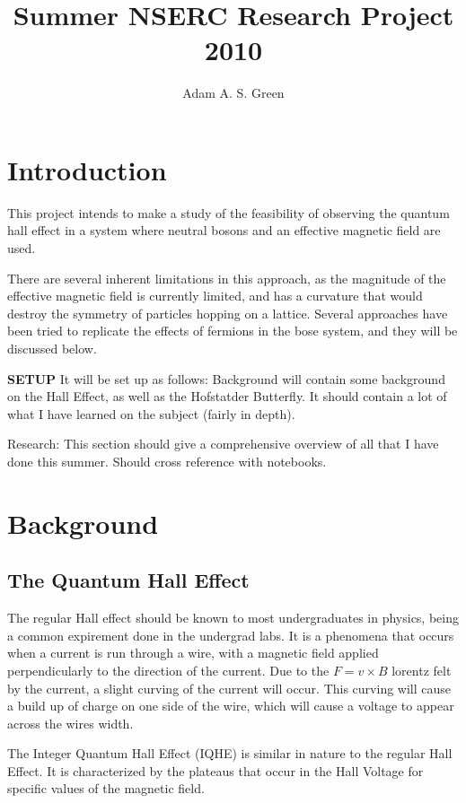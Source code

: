 \documentclass[12pt]{article}
\author{Adam A. S. Green}
\title{Summer NSERC Research Project 2010}
\begin{document}


\maketitle
\doublespacing
\section{Introduction}
This project intends to make a study of the feasibility of observing the quantum hall
effect in a system where neutral bosons and an effective magnetic field are used.

There are several inherent limitations in this approach, as the magnitude of the effective
magnetic field is currently limited, and has a curvature that would destroy the symmetry
of particles hopping on a lattice. Several approaches have been tried to replicate the effects
of fermions in the bose system, and they will be discussed below. 

\textbf{SETUP}
It will be set up as follows:
Background will contain some background on the Hall Effect, as well as the
Hofstatder Butterfly. It should contain a lot of what I have learned on the
subject (fairly in depth). 

Research:
This section should give a comprehensive overview of all that I have done this
summer.
Should cross reference with notebooks.
\section{Background}

\subsection{The Quantum Hall Effect}
The regular Hall effect should be known to most undergraduates in physics, being a common
expirement done in the undergrad labs.
It is a phenomena that occurs when a current is run through a wire, with a magnetic field 
applied perpendicularly to the direction of the current. Due to the $F = v \times B$ lorentz 
felt by the current, a slight curving of the current will occur. This curving will cause a build
up of charge on one side of the wire, which will cause a voltage to appear across the wires 
width.

The Integer Quantum Hall Effect (IQHE) is similar
in nature to the regular Hall Effect.
It is characterized by the plateaus that occur in the Hall Voltage for specific
values of the magnetic field. 
\end{document}

